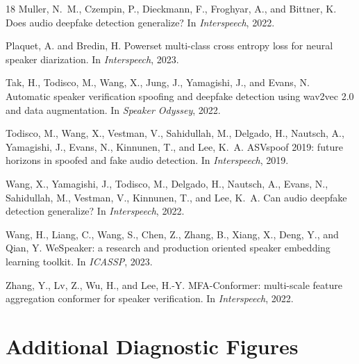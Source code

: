 \documentclass{article}
\begin{document}
\begin{thebibliography}{18}
Muller, N.~M., Czempin, P., Dieckmann, F., Froghyar, A., and Bittner, K.
\newblock Does audio deepfake detection generalize?
\newblock In \emph{Interspeech}, 2022.

Plaquet, A. and Bredin, H.
\newblock Powerset multi-class cross entropy loss for neural speaker
  diarization.
\newblock In \emph{Interspeech}, 2023.

Tak, H., Todisco, M., Wang, X., Jung, J., Yamagishi, J., and Evans, N.
\newblock Automatic speaker verification spoofing and deepfake detection using
  wav2vec 2.0 and data augmentation.
\newblock In \emph{Speaker Odyssey}, 2022.

Todisco, M., Wang, X., Vestman, V., Sahidullah, M., Delgado, H., Nautsch, A.,
  Yamagishi, J., Evans, N., Kinnunen, T., and Lee, K.~A.
\newblock ASVspoof 2019: future horizons in spoofed and fake audio detection.
\newblock In \emph{Interspeech}, 2019.

Wang, X., Yamagishi, J., Todisco, M., Delgado, H., Nautsch, A., Evans, N.,
  Sahidullah, M., Vestman, V., Kinnunen, T., and Lee, K.~A.
\newblock Can audio deepfake detection generalize?
\newblock In \emph{Interspeech}, 2022.

Wang, H., Liang, C., Wang, S., Chen, Z., Zhang, B., Xiang, X., Deng, Y., and
  Qian, Y.
\newblock WeSpeaker: a research and production oriented speaker embedding
  learning toolkit.
\newblock In \emph{ICASSP}, 2023.

Zhang, Y., Lv, Z., Wu, H., and Lee, H.-Y.
\newblock MFA-Conformer: multi-scale feature aggregation conformer for speaker
  verification.
\newblock In \emph{Interspeech}, 2022.

\end{thebibliography}

\appendix

\section{Additional Diagnostic Figures}
\end{document}
